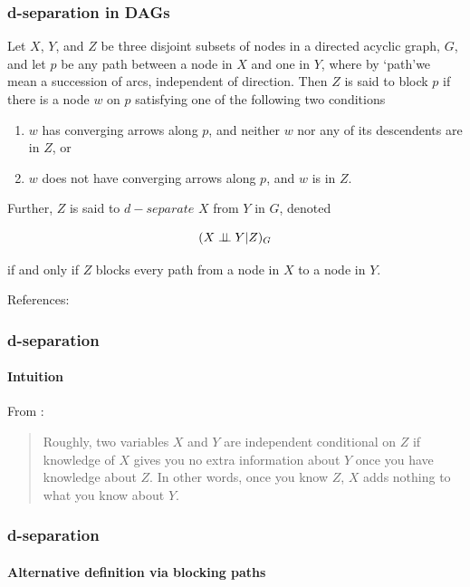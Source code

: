\begin{frame}
\frametitle{d-separation in DAGs}
\begin{definition}
Let $X$, $Y$, and $Z$ be three disjoint subsets of nodes in a directed acyclic graph, $G$, and let $p$ be any path between a node in $X$ and one in $Y$, where by `path'we mean a succession of arcs, independent of direction. Then $Z$ is said to block $p$ if there is a node $w$ on $p$ satisfying one of the following two conditions

\begin{enumerate}
\item $w$ has converging arrows along $p$, and neither $w$ nor any of its descendents are in $Z$, or
\item $w$ does not have converging arrows along $p$, and $w$ is in $Z$.
\end{enumerate}

Further, $Z$ is said to $d-separate$ $X$ from $Y$ in $G$, denoted 

\begin{equation*}
    (X \perp\!\!\!\perp Y | Z)_G
\end{equation*}

if and only if $Z$ blocks every path from a node in $X$ to a node in $Y$.\newline
\end{definition}
References: \cite{pearl1995causal}
\end{frame}


\begin{frame}
\frametitle{d-separation}
\framesubtitle{Intuition}
From \cite{scheines-tutorial}: \newline

\begin{quote}
Roughly, two variables $X$ and $Y$ are independent conditional on $Z$ if knowledge of $X$ gives you no extra information about $Y$ once you have knowledge about $Z$. In other words, once you know $Z$, $X$ adds nothing to what you know about $Y$.
\end{quote}

\end{frame}

\begin{frame}
    \frametitle{d-separation}
    \framesubtitle{Alternative definition via blocking paths}
    
 
\end{frame}

